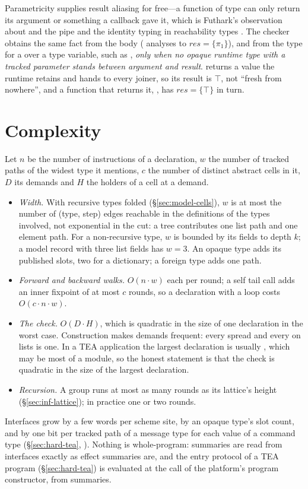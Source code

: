 Parametricity supplies result aliasing for free---a function of type  can only return its
argument or something a callback gave it, which is Futhark's observation about  and the pipe
\citep{henriksen2026aliasing} and the identity typing in reachability types \citep{wei2024polymorphic}.
The checker obtains the same fact from the body ( analyses to $\mathit{res} =
\{\pi_1\}$), and from the type for a  over a type variable, such as ,
\emph{only when no opaque runtime type with a tracked parameter stands between argument and result}.
 returns a value the runtime retains and hands to every joiner, so its
result is $\top$, not ``fresh from nowhere'', and a function that returns it, ,
has $\mathit{res} = \{\top\}$ in turn.

\section{Complexity}
\label{sec:inf-complexity}

Let $n$ be the number of instructions of a declaration, $w$ the number of tracked paths of the widest
type it mentions, $c$ the number of distinct abstract cells in it, $D$ its demands and $H$ the
holders of a cell at a demand.
\begin{itemize}
\item \emph{Width.} With recursive types folded (\S\ref{sec:model-cells}), $w$ is at most the number
of (type, step) edges reachable in the definitions of the types involved, not exponential in the cut:
a tree  contributes one list path and one element path. For a
non-recursive type, $w$ is bounded by its fields to depth $k$; a model record with three list fields
has $w = 3$. An opaque type adds its published slots, two for a dictionary; a foreign type adds one
path.
\item \emph{Forward and backward walks.} $O(n \cdot w)$ each per round; a self tail call adds an inner
fixpoint of at most $c$ rounds, so a declaration with a loop costs $O(c \cdot n \cdot w)$.
\item \emph{The check.} $O(D \cdot H)$, which is quadratic in the size of one declaration in the worst
case. Construction makes demands frequent: every spread and every \code{++} on lists is one. In a TEA
application the largest declaration is usually , which may be most of a module, so the
honest statement is that the check is quadratic in the size of the largest declaration.
\item \emph{Recursion.} A group runs at most as many rounds as its lattice's height
(\S\ref{sec:inf-lattice}); in practice one or two rounds.
\end{itemize}
Interfaces grow by a few words per scheme site, by an opaque type's slot count, and by one bit per
tracked path of a message type for each value of a command type (\S\ref{sec:hard-tea}, ).
Nothing is whole-program: summaries are read from interfaces exactly as effect summaries are, and the
entry protocol of a TEA program (\S\ref{sec:hard-tea}) is evaluated at the call of the platform's
program constructor, from summaries.

